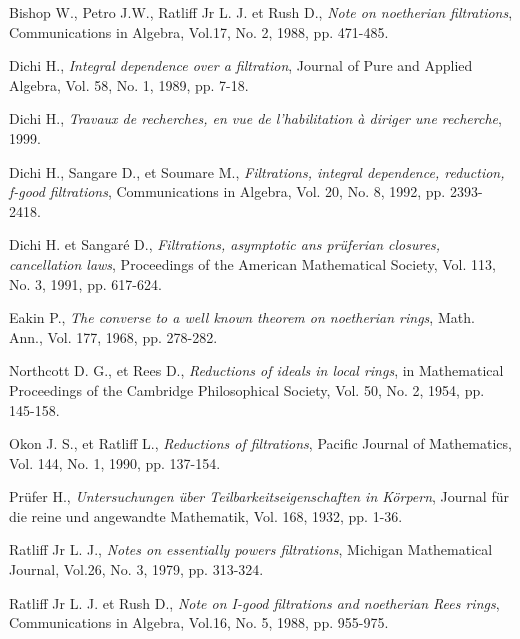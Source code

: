 \begin{thebibliography}{99}
	
	
	 Bishop W., Petro J.W., Ratliff Jr L. J. et Rush D.,\textit{ Note on noetherian filtrations}, Communications in Algebra, Vol.17, No. 2, 1988, pp. 471-485.
	
	 Dichi H.,\textit{ Integral dependence over a filtration}, Journal of Pure and Applied Algebra, Vol. 58, No. 1, 1989, pp. 7-18. 
	
	 Dichi H., \textit{Travaux de recherches, en vue de l'habilitation à diriger une recherche}, 1999.
	
	 Dichi H., Sangare D., et Soumare M.,\textit{ Filtrations, integral dependence, reduction, f-good filtrations}, Communications in Algebra, Vol. 20, No. 8, 1992, pp. 2393-2418.
	
	 Dichi H. et Sangaré D.,\textit{ Filtrations, asymptotic ans prüferian closures, cancellation laws}, Proceedings of the American Mathematical Society, Vol. 113, No. 3, 1991, pp. 617-624. 
	
	 Eakin P., \textit{The converse to a well known theorem on noetherian rings}, Math. Ann., Vol. 177, 1968, pp. 278-282.
	
	 Northcott D. G., et Rees D.,\textit{ Reductions of ideals in local rings}, in Mathematical Proceedings of the Cambridge Philosophical Society, Vol. 50, No. 2, 1954, pp. 145-158.
	
	 Okon J. S., et Ratliff L.,\textit{ Reductions of filtrations}, Pacific Journal of Mathematics, Vol. 144, No. 1, 1990, pp. 137-154.
	
	 Prüfer H.,\textit{ Untersuchungen über Teilbarkeitseigenschaften in Körpern}, Journal für die reine und angewandte Mathematik, Vol. 168, 1932, pp. 1-36.
	
	 Ratliff Jr L. J.,\textit{ Notes on essentially powers filtrations}, Michigan Mathematical Journal, Vol.26, No. 3, 1979, pp. 313-324.
	
	 Ratliff Jr L. J. et Rush D.,\textit{ Note on I-good filtrations and noetherian Rees rings}, Communications in Algebra, Vol.16, No. 5, 1988, pp. 955-975.

\end{thebibliography}
